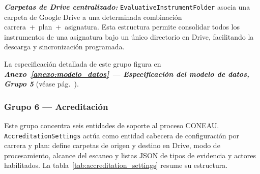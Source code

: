 \textbf{\textit{Carpetas de Drive centralizado:}} \texttt{EvaluativeInstrumentFolder}
asocia una carpeta de Google Drive a una determinada combinación
carrera~+~plan~+~asignatura. Esta estructura permite consolidar todos los
instrumentos de una asignatura bajo un único directorio en Drive, facilitando
la descarga y sincronización programada.

La especificación detallada de este grupo figura en \textbf{\textit{Anexo~\ref{anexo:modelo_datos} — Especificación del modelo de datos, Grupo 5}} (véase pág.~\pageref{anexo:grupo5_modelo_datos}).

\subsubsection*{Grupo 6 — Acreditación}

Este grupo concentra seis entidades de soporte al proceso CONEAU.
\texttt{AccreditationSettings} actúa como entidad cabecera de configuración por
carrera y plan: define carpetas de origen y destino en Drive, modo de
procesamiento, alcance del escaneo y listas JSON de tipos de evidencia y
actores habilitados. La tabla~\ref{tab:accreditation_settings} resume su
estructura.

